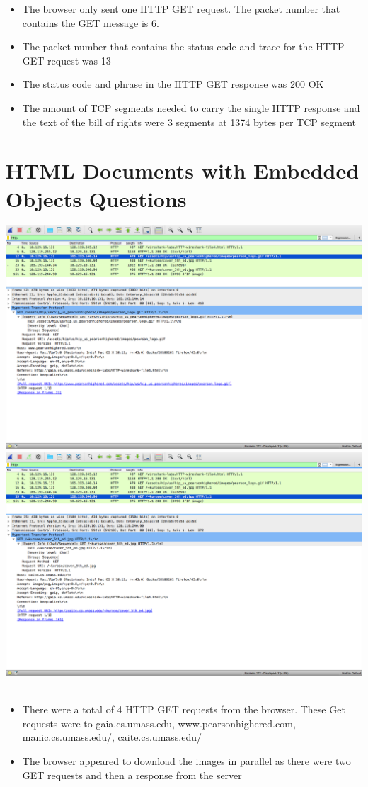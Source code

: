 \documentclass{article}
\begin{document}
\begin{itemize}
  \item The browser only sent one HTTP GET request. The packet number that contains the GET message is 6.
  \item The packet number that contains the status code and trace for the HTTP GET request was 13
  \item The status code and phrase in the HTTP GET response was 200 OK
  \item The amount of TCP segments needed to carry the single HTTP response and the text of the bill of rights were 3 segments at 1374 bytes per TCP segment
\end{itemize}

\section {HTML Documents with Embedded Objects Questions}
\includegraphics[width=\textwidth]{HTMLDocumentsWithEmbeddedObjectsGetGif}\\
\includegraphics[width=\textwidth]{HTMLDocumentsWithEmbeddedObjectsGetJPG}\\\\
\begin{itemize}
  \item There were a total of 4 HTTP GET requests from the browser. These Get requests were to gaia.cs.umass.edu, www.pearsonhighered.com, manic.cs.umass.edu/, caite.cs.umass.edu/
  \item The browser appeared to download the images in parallel as there were two GET requests and then a response from the server
\end{itemize}
\end{document}
